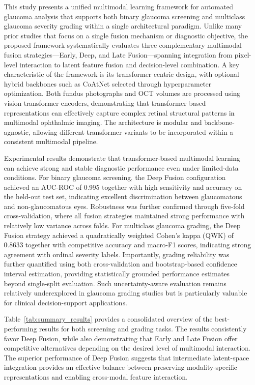 \documentclass[preprint,12pt]{elsarticle}
\begin{document}
This study presents a unified multimodal learning framework for automated glaucoma analysis that supports both binary glaucoma screening and multiclass glaucoma severity grading within a single architectural paradigm. Unlike many prior studies that focus on a single fusion mechanism or diagnostic objective, the proposed framework systematically evaluates three complementary multimodal fusion strategies—Early, Deep, and Late Fusion—spanning integration from pixel-level interaction to latent feature fusion and decision-level combination. A key characteristic of the framework is its transformer-centric design, with optional hybrid backbones such as CoAtNet selected through hyperparameter optimization. Both fundus photographs and OCT volumes are processed using vision transformer encoders, demonstrating that transformer-based representations can effectively capture complex retinal structural patterns in multimodal ophthalmic imaging. The architecture is modular and backbone-agnostic, allowing different transformer variants to be incorporated within a consistent multimodal pipeline.

Experimental results demonstrate that transformer-based multimodal learning can achieve strong and stable diagnostic performance even under limited-data conditions. For binary glaucoma screening, the Deep Fusion configuration achieved an AUC-ROC of 0.995 together with high sensitivity and accuracy on the held-out test set, indicating excellent discrimination between glaucomatous and non-glaucomatous eyes. Robustness was further confirmed through five-fold cross-validation, where all fusion strategies maintained strong performance with relatively low variance across folds. For multiclass glaucoma grading, the Deep Fusion strategy achieved a quadratically weighted Cohen’s kappa (QWK) of 0.8633 together with competitive accuracy and macro-F1 scores, indicating strong agreement with ordinal severity labels. Importantly, grading reliability was further quantified using both cross-validation and bootstrap-based confidence interval estimation, providing statistically grounded performance estimates beyond single-split evaluation. Such uncertainty-aware evaluation remains relatively underexplored in glaucoma grading studies but is particularly valuable for clinical decision-support applications.

Table~\ref{tab:summary_results} provides a consolidated overview of the best-performing results for both screening and grading tasks. The results consistently favor Deep Fusion, while also demonstrating that Early and Late Fusion offer competitive alternatives depending on the desired level of multimodal interaction. The superior performance of Deep Fusion suggests that intermediate latent-space integration provides an effective balance between preserving modality-specific representations and enabling cross-modal feature interaction.
\end{document}
